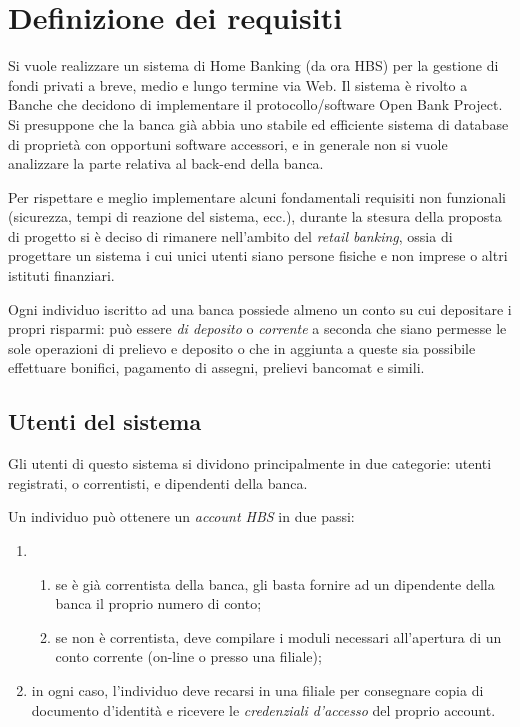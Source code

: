\section{Definizione dei requisiti}

Si vuole realizzare un sistema di Home Banking (da ora HBS) per la gestione di fondi privati a breve, medio e lungo termine via Web. Il sistema è rivolto a Banche che decidono di implementare il protocollo/software Open Bank Project. Si presuppone che la banca già abbia uno stabile ed efficiente sistema di database di proprietà con opportuni software accessori, e in generale non si vuole analizzare la parte relativa al back-end della banca.  

Per rispettare e meglio implementare alcuni fondamentali requisiti non funzionali (sicurezza, tempi di reazione del sistema, ecc.), durante la stesura della proposta di progetto si è deciso di rimanere nell'ambito del \emph{retail banking}, ossia di progettare un sistema i cui unici utenti siano persone fisiche e non imprese o altri istituti finanziari.

Ogni individuo iscritto ad una banca possiede almeno un conto su cui depositare i propri risparmi: può essere \emph{di deposito} o \emph{corrente} a seconda che siano permesse le sole operazioni di prelievo e deposito o che in aggiunta a queste sia possibile  effettuare bonifici, pagamento di assegni, prelievi bancomat e simili.

\subsection{Utenti del sistema}

Gli utenti di questo sistema si dividono principalmente in due categorie: utenti registrati, o correntisti, e dipendenti della banca. 

Un individuo può ottenere un \emph{account HBS} in due passi:
\begin{enumerate}
	\item
	\begin{enumerate}
		\item se è già correntista della banca, gli basta fornire ad un dipendente della banca il proprio numero di conto;
		\item se non è correntista, deve compilare i moduli necessari all'apertura di un conto corrente (on-line o presso una filiale);
	\end{enumerate}
	\item in ogni caso, l'individuo deve recarsi in una filiale per consegnare copia di documento d'identità e ricevere le 					\emph{credenziali d'accesso} del proprio account.
\end{enumerate}

